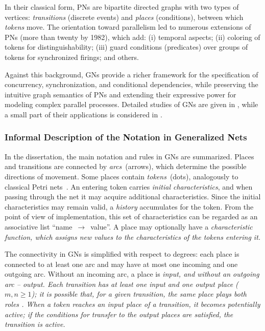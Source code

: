 In their classical form, PNs are bipartite directed graphs with two types of vertices: \emph{transitions} (discrete events) and \emph{places} (conditions), between which \emph{tokens} move. The orientation toward parallelism led to numerous extensions of PNs (more than twenty by 1982), which add: (i) temporal aspects; (ii) coloring of tokens for distinguishability; (iii) guard conditions (predicates) over groups of tokens for synchronized firings; and others.

Against this background, GNs provide a richer framework for the specification of concurrency, synchronization, and conditional dependencies, while preserving the intuitive graph semantics of PNs and extending their expressive power for modeling complex parallel processes. Detailed studies of GNs are given in \cite{DIS-Z3,DIS-Z1,DIS-BAM, DIS-AtanassovSotirova2017}, while a small part of their applications is considered in \cite{DIS-Orozova2011,DIS-Georgiev1998,DIS-StefanovaPavlova2001,DIS-Aladjov2002}.

\subsubsection{Informal Description of the Notation in Generalized Nets}

\hspace*{2.5em}In the dissertation, the main notation and rules in GNs are summarized. Places and transitions are connected by \textit{arcs}\ (arrows), which determine the possible directions of movement. Some places contain \textit{tokens}\ (dots), analogously to classical Petri nets~\cite{DIS-Q148}. An entering token carries \textit{initial characteristics}, and when passing through the net it may acquire additional characteristics. Since the initial characteristics may remain valid, a \textit{history} accumulates for the token. From the point of view of implementation, this set of characteristics can be regarded as an associative list ``name~$\to$~value''. A place may optionally have a \it characteristic function\rm, which assigns new values to the characteristics of the tokens entering it.

The connectivity in GNs is simplified with respect to degrees: each place is connected to at least one arc and may have at most one incoming and one outgoing arc. Without an incoming arc, a place is \it input\rm, and without an outgoing arc -- \it output\rm. Each transition has at least one input and one output place ($m, n \ge 1$); it is possible that, for a given transition, the same place plays both roles \cite{DIS-Z1}. When a token reaches an input place of a transition, it becomes \emph{potentially active}; if the conditions for transfer to the output places are satisfied, the transition is \it active\rm.

